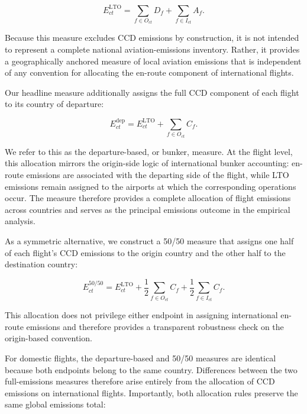 \documentclass[12pt]{article}
\begin{document}
\begin{equation}
E^{\mathrm{LTO}}_{ct}
=
\sum_{f\in O_{ct}}D_f
+
\sum_{f\in I_{ct}}A_f .
\label{eq:nature_5}
\end{equation}

Because this measure excludes CCD emissions by construction, it is not intended to represent a complete national aviation-emissions inventory. Rather, it provides a geographically anchored measure of local aviation emissions that is independent of any convention for allocating the en-route component of international flights.

Our headline measure additionally assigns the full CCD component of each flight to its country of departure:

\begin{equation}
E^{\mathrm{dep}}_{ct}
=
E^{\mathrm{LTO}}_{ct}
+
\sum_{f\in O_{ct}} C_f .
\label{eq:nature_6}
\end{equation}

We refer to this as the departure-based, or bunker, measure. At the flight level, this allocation mirrors the origin-side logic of international bunker accounting: en-route emissions are associated with the departing side of the flight, while LTO emissions remain assigned to the airports at which the corresponding operations occur. The measure therefore provides a complete allocation of flight emissions across countries and serves as the principal emissions outcome in the empirical analysis.

As a symmetric alternative, we construct a 50/50 measure that assigns one half of each flight's CCD emissions to the origin country and the other half to the destination country:

\begin{equation}
E^{50/50}_{ct}
=
E^{\mathrm{LTO}}_{ct}
+
\frac{1}{2}\sum_{f\in O_{ct}} C_f
+
\frac{1}{2}\sum_{f\in I_{ct}} C_f .
\label{eq:nature_7}
\end{equation}

This allocation does not privilege either endpoint in assigning international en-route emissions and therefore provides a transparent robustness check on the origin-based convention.

For domestic flights, the departure-based and 50/50 measures are identical because both endpoints belong to the same country. Differences between the two full-emissions measures therefore arise entirely from the allocation of CCD emissions on international flights. Importantly, both allocation rules preserve the same global emissions total:
\end{document}
